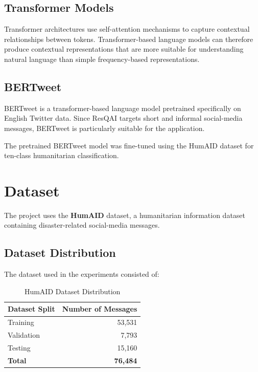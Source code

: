 \documentclass[12pt,a4paper]{article}
\begin{document}
\subsection{Transformer Models}

Transformer architectures use self-attention mechanisms to capture contextual
relationships between tokens. Transformer-based language models can therefore
produce contextual representations that are more suitable for understanding
natural language than simple frequency-based representations.

\subsection{BERTweet}

BERTweet is a transformer-based language model pretrained specifically on
English Twitter data. Since ResQAI targets short and informal social-media
messages, BERTweet is particularly suitable for the application.

The pretrained BERTweet model was fine-tuned using the HumAID dataset for
ten-class humanitarian classification.

\section{Dataset}

The project uses the \textbf{HumAID} dataset, a humanitarian information
dataset containing disaster-related social-media messages.

\subsection{Dataset Distribution}

The dataset used in the experiments consisted of:

\begin{table}[H]
\centering
\caption{HumAID Dataset Distribution}
\begin{tabular}{lr}
\toprule
\textbf{Dataset Split} & \textbf{Number of Messages} \\
\midrule
Training & 53,531 \\
Validation & 7,793 \\
Testing & 15,160 \\
\midrule
\textbf{Total} & \textbf{76,484} \\
\bottomrule
\end{tabular}
\end{table}
\end{document}
